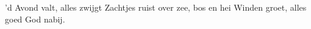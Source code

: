 \beginverse*
'd Avond valt, alles zwijgt
Zachtjes ruist over zee, bos en hei
Winden groet, alles goed
God nabij. 
\endverse
\endsong